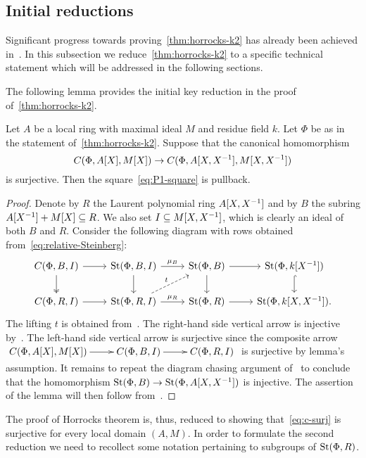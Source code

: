 \subsection{Initial reductions} \label{subsec:structure-theorem-overview}
Significant progress towards proving~\cref{thm:horrocks-k2} has already been achieved in~\cite{LS20}.
In this subsection we reduce~\cref{thm:horrocks-k2} to a specific technical statement which will be addressed in the following sections.

The following lemma provides the initial key reduction in the proof of~\cref{thm:horrocks-k2}.
\begin{lemma} \label{lem:first-reduction}
Let $A$ be a local ring with maximal ideal $M$ and residue field $k$.
Let $\Phi$ be as in the statement of~\cref{thm:horrocks-k2}.
Suppose that the canonical homomorphism
\begin{equation} \label{eq:c-surj} C(\Phi, A[X], M[X]) \to C(\Phi, A[X, X^{-1}], M[X, X^{-1}]) \end{equation}
is surjective.
Then the square~\eqref{eq:P1-square} is pullback.
\end{lemma}
\begin{proof}
    Denote by $R$ the Laurent polynomial ring $A[X, X^{-1}]$ and by $B$ the subring $A[X^{-1}] + M[X] \subseteq R$.
    We also set $I \subseteq M[X, X^{-1}]$, which is clearly an ideal of both $B$ and $R$.
    Consider the following diagram with rows obtained from~\eqref{eq:relative-Steinberg}:
    \[\begin{tikzcd}
          C(\Phi, B, I) \arrow{r} \arrow[d, swap, twoheadrightarrow] & \St(\Phi, B, I) \arrow{r}{\mu_B} \arrow{d} & \St(\Phi, B) \arrow{r} \arrow{d} & \St(\Phi, k[X^{-1}]) \arrow[hookrightarrow]{d} \\
          C(\Phi, R, I) \arrow{r} & \St(\Phi, R, I) \arrow{r}{\mu_R} \arrow[ur, "t", dashrightarrow] & \St(\Phi, R) \arrow{r} & \St(\Phi, k[X, X^{-1}]).
    \end{tikzcd}\]
    The lifting $t$ is obtained from~\cite[Lemma~3.3]{LS20}.
    The right-hand side vertical arrow is injective by~\cite[Lemma~2.2]{LS20}.
    The left-hand side vertical arrow is surjective since the composite arrow
    $\xymatrix{ C(\Phi, A[X], M[X]) \ar[r] & C(\Phi, B, I) \ar[r] & C(\Phi, R, I) }$
    is surjective by lemma's assumption.
    It remains to repeat the diagram chasing argument of~\cite[Theorem~1]{LS20} to conclude that the homomorphism $\operatorname{St}(\Phi, B) \to \operatorname{St}(\Phi, A[X, X^{-1}])$ is injective.
    The assertion of the lemma will then follow from~\cite[Theorem~3]{LS20}.
\end{proof}
The proof of Horrocks theorem is, thus, reduced to showing that~\eqref{eq:c-surj} is surjective for every local domain $(A, M)$.
In order to formulate the second reduction we need to recollect some notation pertaining to subgroups of $\operatorname{St}(\Phi, R)$.

